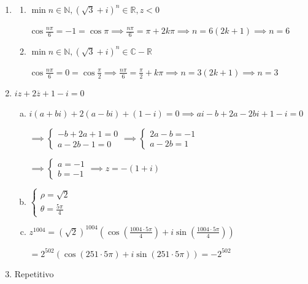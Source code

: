 \documentclass[12pt, openright, a4paper, twoside, english, brazil]{article}
\newenvironment{qitem}{
  \color{black}
\item}{\vspace{10pt}}
\newenvironment{qmitem}{
  \color{black}
\item
\begin{enumerate}[\bfseries a)]}{
\end{enumerate}\vspace{10pt}}
\newcommand{\cis}[1]{\displaystyle(\cos#1+i\sin#1)}
\begin{document}
\begin{enumerate}[\bfseries 1.]
\begin{qmitem}
    \color{black}
  \item $\min n\in\mathbb N,(\sqrt3+i)^n\in\mathbb R, z<0$

    \color{red}
    $\displaystyle\cos{\frac{n\pi}{6}}=-1=\cos\pi\implies
    \frac{n\pi}{6}=\pi+2k\pi\implies n=6(2k+1)\implies n=6$

    \color{black}
  \item $\min n\in\mathbb N,(\sqrt3+i)^n\in\mathbb C-\mathbb R$

    \color{red}
    $\displaystyle\cos{\frac{n\pi}{6}}=0=\cos{\frac{\pi}{2}}\implies
    \frac{n\pi}{6}=\frac{\pi}{2}+k\pi\implies n=3(2k+1)\implies n=3$
  \end{qmitem}

  \begin{qitem} %
    $iz+2\overline{z}+1-i=0$

  \begin{enumerate}[a) ]
    \item
      \color{red}
      $i(a+bi)+2(a-bi)+(1-i)=0\implies ai-b+2a-2bi+1-i=0$

      $\implies
      \begin{cases}-b+2a+1=0\\a-2b-1=0
      \end{cases}\implies
      \begin{cases}2a-b=-1\\a-2b=1
      \end{cases}$

      $\implies
      \begin{cases}a=-1\\b=-1
      \end{cases}\implies z=-(1+i)$

      \color{black}
    \item
      \color{red}
      $\displaystyle
      \begin{cases}\rho=\sqrt2\\\displaystyle\theta=\frac{5\pi}{4}
      \end{cases}$

      \color{black}
    \item
      \color{red}
      $z^{1004}=(\sqrt2)^{1004}\cis{\left(\frac{1004\cdot 5\pi}{4}\right)}$

      $=2^{502}\cis{(251\cdot5\pi)}=-2^{502}$
  \end{enumerate}

\end{qitem}

\begin{qitem} %
  \color{red}Repetitivo
\end{qitem}


\end{enumerate}
\end{document}
